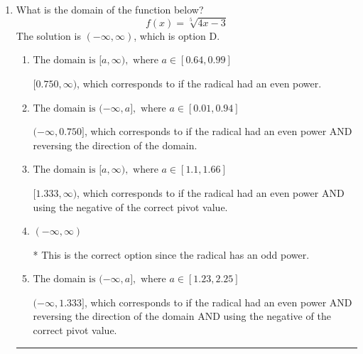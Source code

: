 \documentclass{extbook}[14pt]
\newcommand{\litem}[1]{\item #1

\rule{\textwidth}{0.4pt}}
\begin{document}
\begin{enumerate}\litem{
What is the domain of the function below?
\[ f(x) = \sqrt[5]{4 x - 3} \]The solution is \( (-\infty, \infty) \), which is option D.\begin{enumerate}[label=\Alph*.]
\item \( \text{The domain is } [a, \infty), \text{   where } a \in [0.64, 0.99] \)

$[0.750, \infty)$, which corresponds to if the radical had an even power.
\item \( \text{The domain is } (-\infty, a], \text{   where } a \in [0.01, 0.94] \)

$(-\infty, 0.750]$, which corresponds to if the radical had an even power AND reversing the direction of the domain.
\item \( \text{The domain is } [a, \infty), \text{   where } a \in [1.1, 1.66] \)

$[1.333, \infty)$, which corresponds to if the radical had an even power AND using the negative of the correct pivot value.
\item \( (-\infty, \infty) \)

* This is the correct option since the radical has an odd power.
\item \( \text{The domain is } (-\infty, a], \text{   where } a \in [1.23, 2.25] \)

$(-\infty, 1.333]$, which corresponds to if the radical had an even power AND reversing the direction of the domain AND using the negative of the correct pivot value.
\end{enumerate}

}
\end{enumerate}
\end{document}
